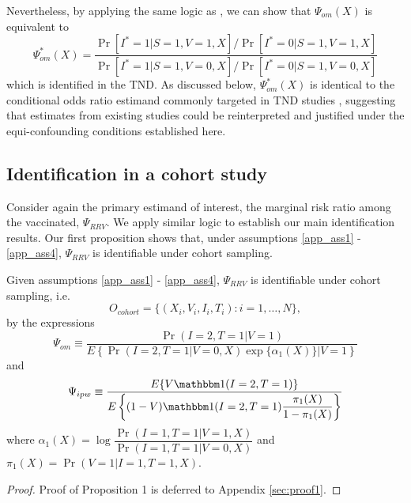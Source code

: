 \documentclass[11pt]{article}
\begin{document}
Nevertheless, by applying the same logic as \textcite{breslow_regression_1976}, we can show that $\Psi_{om}(X)$ is equivalent to
\begin{equation}\label{eqn:or_estimand_tnd}
    \Psi^*_{om}(X) = \dfrac{\Pr[I^* = 1 | S = 1, V = 1, X]/\Pr[I^* = 0 | S = 1, V = 1, X]}{\Pr[I^* = 1 | S = 1, V = 0, X]/\Pr[I^* = 0 | S = 1, V = 0, X]}
\end{equation}  
which is identified in the TND. As discussed below, $\Psi^*_{om}(X)$ is identical to the conditional odds ratio estimand commonly targeted in TND studies \cite{jackson_test-negative_2013}, suggesting that estimates from existing studies could be reinterpreted and justified under the equi-confounding conditions established here.

\subsection{Identification in a cohort study}
Consider again the primary estimand of interest, the marginal risk ratio among the vaccinated, $\Psi_{RRV}$. We apply similar logic to establish our main identification results. Our first proposition shows that, under  assumptions \ref{app_ass1} - \ref{app_ass4}, $\Psi_{RRV}$ is identifiable under cohort sampling. 
\begin{proposition}\label{prop1}
    Given assumptions \ref{app_ass1} - \ref{app_ass4}, $\Psi_{RRV}$ is identifiable under cohort sampling, i.e. 
    $$O_{cohort} = \{(X_i, V_i, I_i, T_i) : i = 1, \ldots, N\},$$ 
    by the expressions 
    \begin{equation}\label{eqn:om_estimand}
        \Psi_{om} \equiv \dfrac{\Pr(I = 2, T = 1 | V = 1)}{E\left\{\Pr(I = 2, T = 1 | V = 0, X) \exp\{\alpha_1(X)\} \Big| V = 1 \right\}}
    \end{equation}
    and 
    \begin{equation}\label{eqn:ipw_estimand}
        \Psi_{ipw} \equiv \dfrac{E\{V \mathbbm 1 (I = 2, T = 1)\}}{E\left\{ (1 - V) \mathbbm 1(I = 2, T = 1) \dfrac{\pi_1(X)}{1 - \pi_1(X)}\right\}}
    \end{equation}
    where $\alpha_1(X) = \log \dfrac{\Pr(I = 1, T = 1 | V = 1, X)}{\Pr(I = 1, T = 1 | V = 0, X)}$ and $\pi_1(X) = \Pr(V = 1| I = 1, T = 1, X)$.
    \end{proposition}

    \begin{proof}
        Proof of Proposition 1 is deferred to Appendix \ref{sec:proof1}.
    \end{proof}
    
\end{document}

